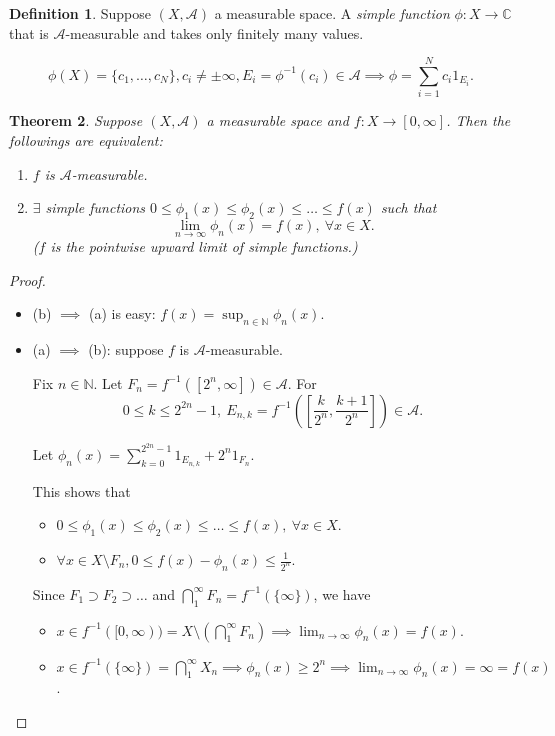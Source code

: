 \documentclass{report}
\newcommand{\C}{\mathbb{C}}
\newcommand{\N}{\mathbb{N}}
\newcommand{\cA}{\mathcal{A}}
\newtheorem{theorem}{Theorem}[chapter]
\theoremstyle{definition}
\newtheorem{definition}[theorem]{Definition}
\theoremstyle{remark}
\begin{document}
\begin{definition}
	Suppose $(X, \mathcal{A})$ a measurable space. A \emph{simple function} $\phi: X \to \C$ that is $\mathcal{A}$-measurable and takes only finitely many values.
\end{definition}
\[
	\phi(X) = \{c_1, \ldots, c_N\}, c_i \neq \pm \infty, E_i = \phi^{-1}(c_i) \in \cA \implies \phi = \sum_{i=1}^N c_i 1_{E_i}.
\]

\begin{theorem}
	Suppose $(X, \cA)$ a measurable space and $f: X \to [0, \infty]$. Then the followings are equivalent:
	\begin{enumerate}
		\item $f$ is $\cA$-measurable.
		\item $\exists$ simple functions $0 \leq \phi_1(x) \leq \phi_2(x) \leq \ldots \leq f(x)$ such that \[\lim_{n \to \infty} \phi_n(x) = f(x),\ \forall x \in X.\] ($f$ is the pointwise upward limit of simple functions.)
	\end{enumerate}
\end{theorem}
\begin{proof}
	\begin{itemize}
		\item (b) $\implies$ (a) is easy: $\displaystyle f(x) = \sup_{n \in \N} \phi_n(x)$.
		\item (a) $\implies$ (b): suppose $f$ is $\cA$-measurable.
		
		Fix $n \in \N$. Let $F_n = f^{-1}([2^n, \infty]) \in \cA$. For
		\[0 \leq k \leq 2^{2n} - 1,\ E_{n, k} = f^{-1}\left(\left[\frac{k}{2^n}, \frac{k+1}{2^n}\right]\right) \in \cA.\]

		Let $\displaystyle \phi_n(x) = \sum_{k=0}^{2^{2n} - 1} 1_{E_{n, k}} + 2^n1_{F_n}$.

		This shows that \begin{itemize}
			\item $\displaystyle 0 \leq \phi_1(x) \leq \phi_2(x) \leq \ldots \leq f(x),\ \forall x \in X$.
			\item $\displaystyle \forall x \in X \setminus F_n, 0 \leq f(x) - \phi_n(x) \leq \frac{1}{2^n}$.
		\end{itemize}
		Since $F_1 \supset F_2 \supset \ldots$ and $\displaystyle \bigcap_1^\infty F_n = f^{-1}(\{\infty\})$, we have \begin{itemize}
			\item $\displaystyle x \in f^{-1}([0, \infty)) = X \setminus \left(\bigcap_1^\infty F_n\right) \implies \lim_{n \to \infty} \phi_n(x) = f(x)$.
			\item $\displaystyle x \in f^{-1}(\{\infty\}) = \bigcap_1^\infty X_n \implies \phi_n(x) \geq 2^n \implies \lim_{n \to \infty} \phi_n(x) = \infty = f(x)$. \qedhere 
		\end{itemize}
	\end{itemize}
\end{proof}
\end{document}

